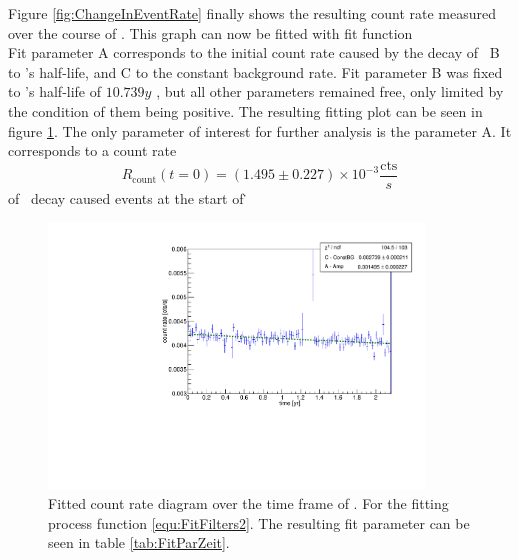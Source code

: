 \documentclass[encoding=utf8,british]{tumphthesis}
\begin{document}
Figure \ref{fig:ChangeInEventRate} finally shows the resulting count rate measured over the course of \PII.
This graph can now be fitted with fit function
\begin{equation}

\end{equation}
Fit parameter A corresponds to the initial count rate caused by the decay of \Kr\, B to \Kr's half-life, and C to the constant background rate.
Fit parameter B was fixed to \Kr's half-life of \(10.739\unit{y}\) , but all other parameters remained free, only limited by the condition of them being positive.
The resulting fitting plot can be seen in figure  \ref{fig:ChangeInEventRateFit}.
The only parameter of interest for further analysis is the parameter \(\mathrm{A}\). 
It corresponds to a count rate  
\begin{equation*}
R_{\mathrm{count}}(t = 0) = (1.495\pm0.227) \times 10^{-3} \frac{\mathrm{cts}}{\unit{s}}
\end{equation*}of \Kr\ decay caused events at the start of \PII\.

\begin{figure}[t!]
	\centering
	\ifmakefigures%
	\includegraphics[width=100mm]{./Bilder/eventRateFit.pdf}
	\fi%
	\caption{
	    Fitted count rate diagram over the time frame of \PII.
	    For the fitting process function \ref{equ:FitFilters2}.
	    The resulting fit parameter can be seen in table \ref{tab:FitParZeit}.
	}
	\label{fig:ChangeInEventRateFit}
\end{figure}%
\end{document}
